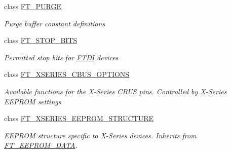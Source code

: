 \begin{DoxyCompactItemize}
class \mbox{\hyperlink{class_f_t_d2_x_x___n_e_t_1_1_f_t_d_i_1_1_f_t___p_u_r_g_e}{F\+T\+\_\+\+P\+U\+R\+GE}}
\begin{DoxyCompactList}\small\item\em Purge buffer constant definitions \end{DoxyCompactList}\item 
class \mbox{\hyperlink{class_f_t_d2_x_x___n_e_t_1_1_f_t_d_i_1_1_f_t___s_t_o_p___b_i_t_s}{F\+T\+\_\+\+S\+T\+O\+P\+\_\+\+B\+I\+TS}}
\begin{DoxyCompactList}\small\item\em Permitted stop bits for \mbox{\hyperlink{class_f_t_d2_x_x___n_e_t_1_1_f_t_d_i}{F\+T\+DI}} devices \end{DoxyCompactList}\item 
class \mbox{\hyperlink{class_f_t_d2_x_x___n_e_t_1_1_f_t_d_i_1_1_f_t___x_s_e_r_i_e_s___c_b_u_s___o_p_t_i_o_n_s}{F\+T\+\_\+\+X\+S\+E\+R\+I\+E\+S\+\_\+\+C\+B\+U\+S\+\_\+\+O\+P\+T\+I\+O\+NS}}
\begin{DoxyCompactList}\small\item\em Available functions for the X-\/\+Series C\+B\+US pins. Controlled by X-\/\+Series E\+E\+P\+R\+OM settings \end{DoxyCompactList}\item 
class \mbox{\hyperlink{class_f_t_d2_x_x___n_e_t_1_1_f_t_d_i_1_1_f_t___x_s_e_r_i_e_s___e_e_p_r_o_m___s_t_r_u_c_t_u_r_e}{F\+T\+\_\+\+X\+S\+E\+R\+I\+E\+S\+\_\+\+E\+E\+P\+R\+O\+M\+\_\+\+S\+T\+R\+U\+C\+T\+U\+RE}}
\begin{DoxyCompactList}\small\item\em E\+E\+P\+R\+OM structure specific to X-\/\+Series devices. Inherits from \mbox{\hyperlink{class_f_t_d2_x_x___n_e_t_1_1_f_t_d_i_1_1_f_t___e_e_p_r_o_m___d_a_t_a}{F\+T\+\_\+\+E\+E\+P\+R\+O\+M\+\_\+\+D\+A\+TA}}. \end{DoxyCompactList}\end{DoxyCompactItemize}

